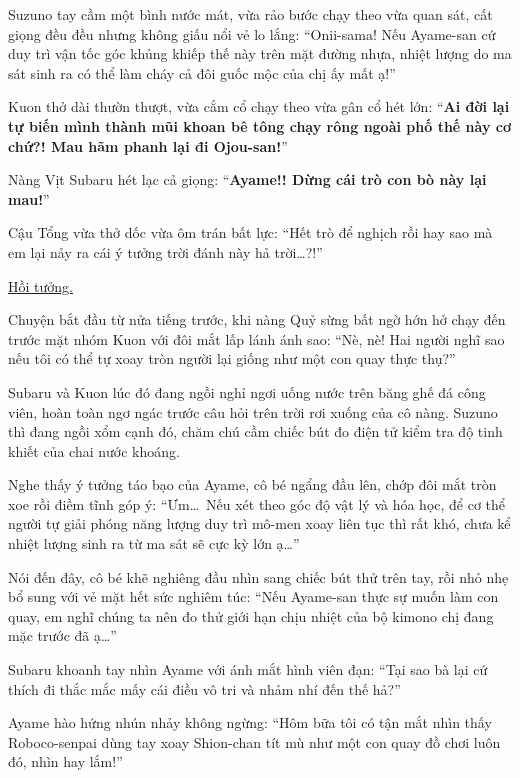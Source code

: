 \documentclass[../main.tex]{subfiles}
\begin{document}

Suzuno tay cầm một bình nước mát, vừa rảo bước chạy theo vừa quan sát, cất giọng đều đều nhưng không giấu nổi vẻ lo lắng: ``Onii-sama! Nếu Ayame-san cứ duy trì vận tốc góc khủng khiếp thế này trên mặt đường nhựa, nhiệt lượng do ma sát sinh ra có thể làm cháy cả đôi guốc mộc của chị ấy mất ạ!''

Kuon thở dài thườn thượt, vừa cắm cổ chạy theo vừa gân cổ hét lớn: ``\textbf{Ai đời lại tự biến mình thành mũi khoan bê tông chạy rông ngoài phố thế này cơ chứ?! Mau hãm phanh lại đi Ojou-san!}''

Nàng Vịt Subaru hét lạc cả giọng: ``\textbf{Ayame!! Dừng cái trò con bò này lại mau!}''

Cậu Tổng vừa thở dốc vừa ôm trán bất lực: ``Hết trò để nghịch rồi hay sao mà em lại nảy ra cái ý tưởng trời đánh này hả trời\dots?!''

\begin{center}
    \uline{Hồi tưởng.}
\end{center}

Chuyện bắt đầu từ nửa tiếng trước, khi nàng Quỷ sừng bất ngờ hớn hở chạy đến trước mặt nhóm Kuon với đôi mắt lấp lánh ánh sao: ``Nè, nè! Hai người nghĩ sao nếu tôi có thể tự xoay tròn người lại giống như một con quay thực thụ?''

Subaru và Kuon lúc đó đang ngồi nghỉ ngơi uống nước trên băng ghế đá công viên, hoàn toàn ngơ ngác trước câu hỏi trên trời rơi xuống của cô nàng. Suzuno thì đang ngồi xổm cạnh đó, chăm chú cầm chiếc bút đo điện tử kiểm tra độ tinh khiết của chai nước khoáng.

Nghe thấy ý tưởng táo bạo của Ayame, cô bé ngẩng đầu lên, chớp đôi mắt tròn xoe rồi điềm tĩnh góp ý: ``Ưm\dots\ Nếu xét theo góc độ vật lý và hóa học, để cơ thể người tự giải phóng năng lượng duy trì mô-men xoay liên tục thì rất khó, chưa kể nhiệt lượng sinh ra từ ma sát sẽ cực kỳ lớn ạ\dots''

Nói đến đây, cô bé khẽ nghiêng đầu nhìn sang chiếc bút thử trên tay, rồi nhỏ nhẹ bổ sung với vẻ mặt hết sức nghiêm túc: ``Nếu Ayame-san thực sự muốn làm con quay, em nghĩ chúng ta nên đo thử giới hạn chịu nhiệt của bộ kimono chị đang mặc trước đã ạ\dots''

Subaru khoanh tay nhìn Ayame với ánh mắt hình viên đạn: ``Tại sao bà lại cứ thích đi thắc mắc mấy cái điều vô tri và nhảm nhí đến thế hả?''

Ayame hào hứng nhún nhảy không ngừng: ``Hôm bữa tôi có tận mắt nhìn thấy Roboco-senpai dùng tay xoay Shion-chan tít mù như một con quay đồ chơi luôn đó, nhìn hay lắm!''
\end{document}
